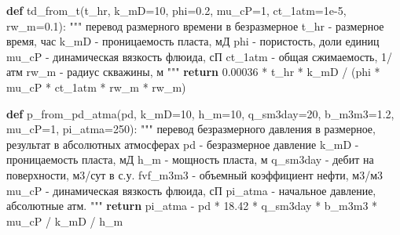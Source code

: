 \documentclass[
  russian,
  letterpaper,
  DIV=11,
  numbers=noendperiod,
  oneside]{scrartcl}
\newenvironment{Shaded}{\begin{snugshade}}{\end{snugshade}}
\newcommand{\CommentTok}[1]{\textcolor[rgb]{0.37,0.37,0.37}{#1}}
\newcommand{\ControlFlowTok}[1]{\textcolor[rgb]{0.00,0.23,0.31}{\textbf{#1}}}
\newcommand{\DecValTok}[1]{\textcolor[rgb]{0.68,0.00,0.00}{#1}}
\newcommand{\FloatTok}[1]{\textcolor[rgb]{0.68,0.00,0.00}{#1}}
\newcommand{\KeywordTok}[1]{\textcolor[rgb]{0.00,0.23,0.31}{\textbf{#1}}}
\newcommand{\NormalTok}[1]{\textcolor[rgb]{0.00,0.23,0.31}{#1}}
\newcommand{\OperatorTok}[1]{\textcolor[rgb]{0.37,0.37,0.37}{#1}}
\begin{document}
\begin{Shaded}
\begin{Highlighting}[]
\KeywordTok{def}\NormalTok{ td\_from\_t(t\_hr, k\_mD}\OperatorTok{=}\DecValTok{10}\NormalTok{, phi}\OperatorTok{=}\FloatTok{0.2}\NormalTok{, mu\_cP}\OperatorTok{=}\DecValTok{1}\NormalTok{, ct\_1atm}\OperatorTok{=}\FloatTok{1e{-}5}\NormalTok{, rw\_m}\OperatorTok{=}\FloatTok{0.1}\NormalTok{):}
    \CommentTok{"""}
\CommentTok{    перевод размерного времени в безразмерное}
\CommentTok{    t\_hr {-} размерное время, час}
\CommentTok{    k\_mD {-} проницаемость пласта, мД}
\CommentTok{    phi {-} пористость, доли единиц}
\CommentTok{    mu\_cP {-} динамическая вязкость флюида, сП}
\CommentTok{    ct\_1atm {-} общая сжимаемость, 1/атм}
\CommentTok{    rw\_m {-} радиус скважины, м}
\CommentTok{    """}
    \ControlFlowTok{return}  \FloatTok{0.00036} \OperatorTok{*}\NormalTok{ t\_hr }\OperatorTok{*}\NormalTok{ k\_mD }\OperatorTok{/}\NormalTok{ (phi }\OperatorTok{*}\NormalTok{ mu\_cP }\OperatorTok{*}\NormalTok{ ct\_1atm }\OperatorTok{*}\NormalTok{ rw\_m }\OperatorTok{*}\NormalTok{ rw\_m) }

\KeywordTok{def}\NormalTok{ p\_from\_pd\_atma(pd, }
\NormalTok{                   k\_mD}\OperatorTok{=}\DecValTok{10}\NormalTok{, h\_m}\OperatorTok{=}\DecValTok{10}\NormalTok{, }
\NormalTok{                   q\_sm3day}\OperatorTok{=}\DecValTok{20}\NormalTok{, b\_m3m3}\OperatorTok{=}\FloatTok{1.2}\NormalTok{, mu\_cP}\OperatorTok{=}\DecValTok{1}\NormalTok{, pi\_atma}\OperatorTok{=}\DecValTok{250}\NormalTok{):}
    \CommentTok{"""}
\CommentTok{    перевод безразмерного давления в размерное, результат }
\CommentTok{    в абсолютных атмосферах}
\CommentTok{    pd {-} безразмерное давление}
\CommentTok{    k\_mD {-} проницаемость пласта, мД}
\CommentTok{    h\_m {-} мощность пласта, м}
\CommentTok{    q\_sm3day {-} дебит на поверхности, м3/сут в с.у.}
\CommentTok{    fvf\_m3m3 {-} объемный коэффициент нефти, м3/м3}
\CommentTok{    mu\_cP {-} динамическая вязкость флюида, сП}
\CommentTok{    pi\_atma {-} начальное давление, абсолютные атм.}
\CommentTok{    """}
    \ControlFlowTok{return}\NormalTok{ pi\_atma }\OperatorTok{{-}}\NormalTok{ pd }\OperatorTok{*} \FloatTok{18.42} \OperatorTok{*}\NormalTok{ q\_sm3day }\OperatorTok{*}\NormalTok{ b\_m3m3 }\OperatorTok{*}\NormalTok{ mu\_cP }\OperatorTok{/}\NormalTok{ k\_mD }\OperatorTok{/}\NormalTok{ h\_m }


\end{Highlighting}
\end{Shaded}
\end{document}
